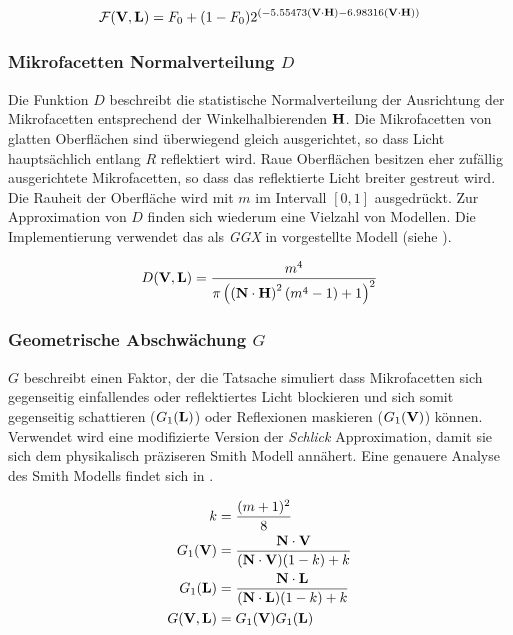 \begin{align}
	\label{eq:fresnel-schlick}
	\mathcal F(\mathbf V,\mathbf L) = F_0  + (1 - F_0) 2^{(-5.55473 (\mathbf V \cdot \mathbf H) - 6.98316 (\mathbf V \cdot \mathbf H))}
\end{align}


\subsubsection[Mikrofacetten Normalverteilung]{Mikrofacetten Normalverteilung $D$} 
Die Funktion $D$ beschreibt die statistische Normalverteilung der Ausrichtung der Mikrofacetten entsprechend der Winkelhalbierenden $\mathbf H$. Die Mikrofacetten von glatten Oberflächen sind überwiegend gleich ausgerichtet, so dass Licht hauptsächlich entlang $R$ reflektiert wird. Raue Oberflächen besitzen eher zufällig ausgerichtete Mikrofacetten, so dass das reflektierte Licht breiter gestreut wird. Die Rauheit der Oberfläche wird mit $m$ im Intervall $[0,1]$ ausgedrückt. Zur Approximation von $D$ finden sich wiederum eine Vielzahl von Modellen. Die Implementierung verwendet das als \textit{GGX} in \cite{Walter2007} vorgestellte Modell (siehe ).

\begin{align}
	\label{eq:ggx}
	D(\mathbf V,\mathbf L) = \frac{m^4}{ \pi \left(\left( \mathbf N \cdot \mathbf H \right)^2\left(m^4 - 1\right) + 1\right)^2}
\end{align}


\subsubsection[Geometrische Abschwächung]{Geometrische Abschwächung $G$} 
$G$ beschreibt einen Faktor, der die Tatsache simuliert dass Mikrofacetten sich gegenseitig einfallendes oder reflektiertes Licht blockieren und sich somit gegenseitig schattieren ($G_1(\mathbf L)$) oder Reflexionen maskieren ($G_1(\mathbf V)$) können. Verwendet wird eine modifizierte Version der \textit{Schlick} Approximation, damit sie sich dem physikalisch präziseren Smith Modell annähert. Eine genauere Analyse des Smith Modells findet sich in \cite[Kapitel 6, Seite 33]{Heitz2014}.

\begin{align}
	\label{eq:geometric-schlick}
	k &= \frac{(m + 1)^2}{8}\\
	G_1(\mathbf V) &= \frac{\mathbf N \cdot \mathbf V}{(\mathbf N \cdot \mathbf V)(1-k)+k}\\
	G_1(\mathbf L) &= \frac{\mathbf N \cdot \mathbf L}{(\mathbf N \cdot \mathbf L)(1-k)+k}\\
	G(\mathbf V,\mathbf L) &= G_1(\mathbf V) G_1(\mathbf L)
\end{align}


